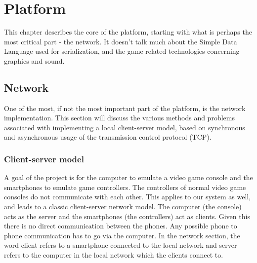\documentclass{article}
\begin{document}
\section{Platform}
This chapter describes the core of the platform, starting with what is perhaps the most critical
part - the network. It doesn't talk much about the Simple Data Language used for serialization, and
 the game related technologies concerning graphics and sound. 

\subsection{Network}
One of the most, if not the most important part of the platform, is the network implementation.
This section will discuss the various methods and problems associated with implementing a local
client-server model, based on synchronous and asynchronous usage of the transmission control
protocol (TCP).

\subsubsection{Client-server model}
A goal of the project is for the computer to emulate a video game console and the smartphones to
emulate game controllers. The controllers of normal video game consoles do not communicate
with each other. This applies to our system as well, and leads to a classic client-server network
model. The computer (the console) acts as the server and the smartphones (the controllers) act as
clients. Given this there is no direct communication between the phones. Any possible phone to
phone communication has to go via the computer. In the network section, the word client refers
to a smartphone connected to the local network and server refers to the computer in the local
network which the clients connect to.
\end{document}
